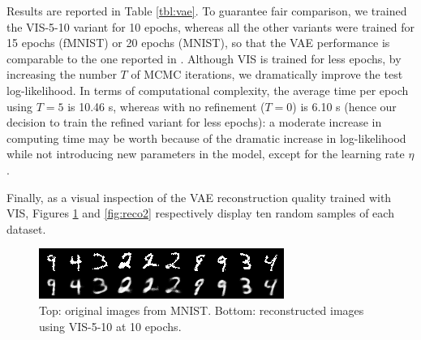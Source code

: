 Results are reported in Table \ref{tbl:vae}. To guarantee 
 fair comparison, we trained the VIS-5-10 variant for 10 epochs, whereas all the other variants were trained for 15 epochs (fMNIST) or 20 epochs (MNIST), so that the VAE performance is comparable to the one reported in \cite{pmlr-v89-titsias19a}. Although VIS is trained for less epochs, by increasing the number $T$ of MCMC iterations, we dramatically improve the test log-likelihood. In terms of computational complexity, the average time per epoch using $T=5$ is 10.46 s, whereas with no refinement ($T=0$) is 6.10 s (hence our decision to train the refined variant for less epochs): a moderate increase in computing time may be worth because of the dramatic increase in log-likelihood while not introducing new parameters in the model, except for the learning rate $\eta$.

Finally, as a visual inspection of the VAE reconstruction 
quality trained with VIS, Figures \ref{fig:reco} and \ref{fig:reco2} respectively display ten random samples of each dataset.
\begin{figure}[!ht]
  \begin{center}
\includegraphics[width=\linewidth]{img/reco_mnist.png}
\end{center}
  \caption{Top: original images from MNIST. Bottom: reconstructed images using VIS-5-10 at 10 epochs.}\label{fig:reco}
\end{figure}

